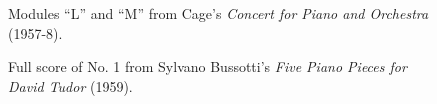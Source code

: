     \begin{figure}
        \centering
        
            \vspace{10pt}
            
        \captionsetup{width=.5\textwidth}
        \caption[Modules ``L'' and ``M'' from the piano solo of Cage's \textit{Concert for Piano and Orchestra} (1957-8).]{Modules ``L'' and ``M'' from Cage's \textit{Concert for Piano and Orchestra} (1957-8).\footnotemark}
        \label{fig:cagepiano1}
    \end{figure}

    \begin{figure}
        \centering
        \captionsetup{width=.5\textwidth}
        \caption[Full score of No. 1 from Sylvano Bussotti's \textit{Five Piano Pieces for David Tudor} (1959).]{Full score of No. 1 from Sylvano Bussotti's \textit{Five Piano Pieces for David Tudor} (1959).\footnotemark}
        \label{fig:bussottipiano1}
    \end{figure}

